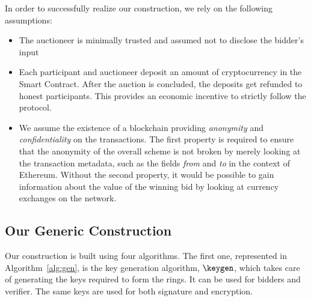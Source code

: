 In order to successfully realize our construction, we rely on the following assumptions:
\begin{itemize}
    \item The auctioneer is minimally trusted and assumed not to disclose the bidder's input
    \item Each participant and auctioneer deposit an amount of cryptocurrency in the Smart Contract. After the auction is concluded, the deposits get refunded to honest participants. This provides an economic incentive to strictly follow the protocol.
    \item We assume the existence of a blockchain providing \textit{anonymity} and \textit{confidentiality} on the transactions. The first property is required to ensure that the anonymity of the overall scheme is not broken by merely looking at the transaction metadata, such as the fields \textit{from} and \textit{to} in the context of Ethereum. Without the second property, it would be possible to gain information about the value of the winning bid by looking at currency exchanges on the network. 
\end{itemize}
\subsection{Our Generic Construction}
Our construction is built using four algorithms. The first one, represented in
Algorithm~\ref{alg:gen}, is the key generation algorithm, $\keygen$, which takes care of generating the keys required to form the rings.
It can be used for bidders and verifier. The same keys are used for both signature and encryption.

